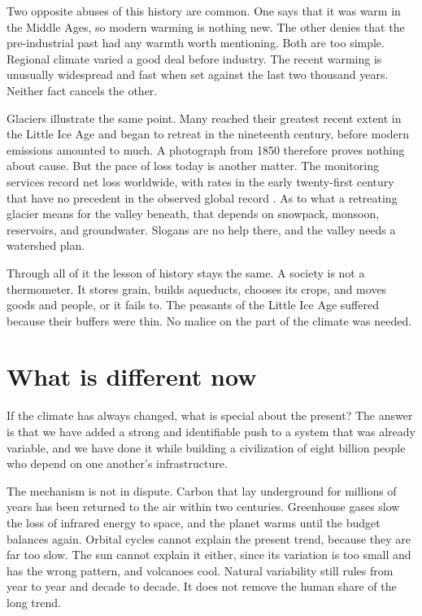 \documentclass[12pt,a4paper]{book}
\begin{document}
Two opposite abuses of this history are common. One says that it was warm in the Middle Ages, so modern warming is nothing new. The other denies that the pre-industrial past had any warmth worth mentioning. Both are too simple. Regional climate varied a good deal before industry. The recent warming is unusually widespread and fast when set against the last two thousand years. Neither fact cancels the other.

Glaciers illustrate the same point. Many reached their greatest recent extent in the Little Ice Age and began to retreat in the nineteenth century, before modern emissions amounted to much. A photograph from 1850 therefore proves nothing about cause. But the pace of loss today is another matter. The monitoring services record net loss worldwide, with rates in the early twenty-first century that have no precedent in the observed global record \cite{Copernicus2026Glaciers,WGMSLatestGlacierData}. As to what a retreating glacier means for the valley beneath, that depends on snowpack, monsoon, reservoirs, and groundwater. Slogans are no help there, and the valley needs a watershed plan.

Through all of it the lesson of history stays the same. A society is not a thermometer. It stores grain, builds aqueducts, chooses its crops, and moves goods and people, or it fails to. The peasants of the Little Ice Age suffered because their buffers were thin. No malice on the part of the climate was needed.

\section{What is different now}

If the climate has always changed, what is special about the present? The answer is that we have added a strong and identifiable push to a system that was already variable, and we have done it while building a civilization of eight billion people who depend on one another's infrastructure.

The mechanism is not in dispute. Carbon that lay underground for millions of years has been returned to the air within two centuries. Greenhouse gases slow the loss of infrared energy to space, and the planet warms until the budget balances again. Orbital cycles cannot explain the present trend, because they are far too slow. The sun cannot explain it either, since its variation is too small and has the wrong pattern, and volcanoes cool. Natural variability still rules from year to year and decade to decade. It does not remove the human share of the long trend.
\end{document}

